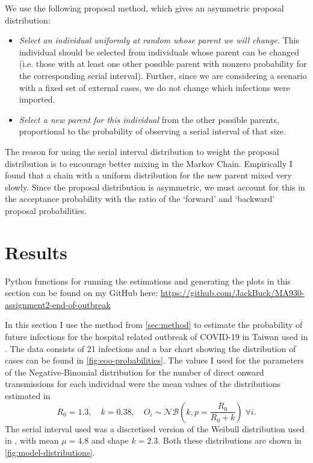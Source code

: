 \documentclass{article}
\begin{document}
We use the following proposal method, which gives an asymmetric proposal distribution:
\begin{itemize}
    \item \emph{Select an individual uniformly at random whose parent we will change.} This individual should be selected from individuals whose parent can be changed (i.e. those with at least one other possible parent with nonzero probability for the corresponding serial interval). Further, since we are considering a scenario with a fixed set of external cases, we do not change which infections were imported.
    \item \emph{Select a new parent for this individual} from the other possible parents, proportional to the probability of observing a serial interval of that size.
\end{itemize}
The reason for using the serial interval distribution to weight the proposal distribution is to encourage better mixing in the Markov Chain. Empirically I found that a chain with a uniform distribution for the new parent mixed very slowly. Since the proposal distribution is asymmetric, we must account for this in the acceptance probability with the ratio of the `forward' and `backward' proposal probabilities.

\section{Results}
Python functions for running the estimations and generating the plots in this section can be found on my GitHub here:
\url{https://github.com/JackBuck/MA930-assignment2-end-of-outbreak}

In this section I use the method from \autoref{sec:method} to estimate the probability of future infections for the hospital related outbreak of COVID-19 in Taiwan used in \cite{Akhmetzhanov2021}. The data consists of 21 infections and a bar chart showing the distribution of cases can be found in \autoref{fig:eoo-probabilities}. The values I used for the parameters of the Negative-Binomial distribution for the number of direct onward transmissions for each individual were the mean values of the distributions estimated in \cite{Akhmetzhanov2021}
\[R_0 = 1.3, \quad k = 0.38, \quad O_i \sim \mathcal{NB}\left(k, p=\frac{R_0}{R_0 + k}\right) \;\forall i.\]
The serial interval used was a discretised version of the Weibull distribution used in \cite{Akhmetzhanov2021}, with mean \(\mu = 4.8\) and shape \(k = 2.3\).
Both these distributions are shown in \autoref{fig:model-distributions}.
\end{document}
